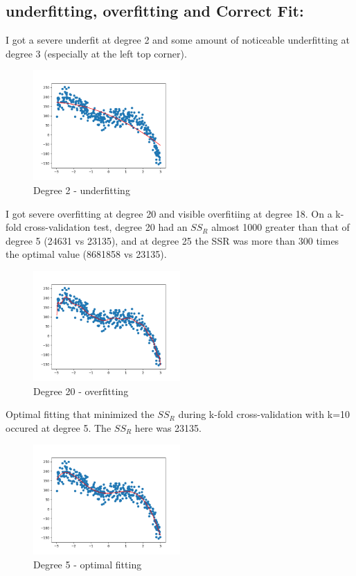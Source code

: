 \subsection{underfitting, overfitting and Correct Fit: }
I got a severe underfit at degree 2 and some amount of noticeable underfitting at degree 3 (especially at the left top corner).
\begin{figure}[H]
    \centering
    \includegraphics[width=0.5\textwidth]{../q3/degree_2.png}
    \caption{Degree 2 - underfitting}
    \label{fig:q3_1}
\end{figure}
I got severe overfitting at degree 20 and visible overfitiing at degree 18. On a k-fold cross-validation test, degree 20 had an $SS_R$ almost 1000 greater than that of degree 5 (24631 vs 23135), and at degree 25 the SSR was more than 300 times the optimal value (8681858 vs 23135).
\begin{figure}[H]
    \centering
    \includegraphics[width=0.5\textwidth]{../q3/degree_20.png}
    \caption{Degree 20 - overfitting}
    \label{fig:q3_2}
\end{figure}  
Optimal fitting that minimized the $SS_R$ during k-fold cross-validation with k=10 occured at degree 5. The $SS_R$ here was 23135.
\begin{figure}[H]
    \centering
    \includegraphics[width=0.5\textwidth]{../q3/degree_5.png}
    \caption{Degree 5 - optimal fitting}
    \label{fig:q3_3}
\end{figure}
